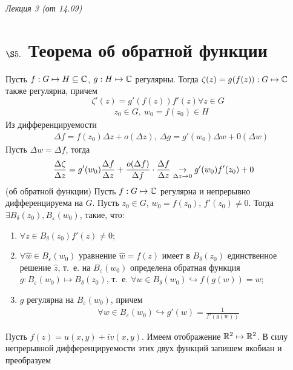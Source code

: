 \begin{flushright}
    \textit{Лекция 3 (от 14.09)}
\end{flushright}
\section{$\S 5.$ Теорема об обратной функции}
\theorem
Пусть $f: G \mapsto H \subseteq \mathbb{C}$, $g: H \mapsto \mathbb{C}$ регулярны.
Тогда $\zeta(z) = g(f(z)): G \mapsto \mathbb{C}$ также регулярна, причем
\begin{equation}\label{(3.1)}
    \zeta'(z) = g'(f(z))f'(z) \forall z \in G
\end{equation}
\pr
\begin{align*}
  & z_0 \in G, \ w_0 = f(z_0) \in H
\end{align*}
Из дифференцируемости
\begin{align*}
  & \Delta f = f(z_0)\Delta z + o(\Delta z), \ \Delta g = g'(w_0) \Delta w + 0(\Delta w)
\end{align*}
Пусть $\Delta w = \Delta f$, тогда
\begin{align*}
  & \frac{\Delta \zeta}{\Delta z} = g'(w_0) \frac{\Delta f}{\Delta z} + \frac{o(\Delta f)}{\Delta f} \cdot \frac{\Delta f}{\Delta z} \underset{\Delta z \to 0}{\to} g'(w_0)f'(z_0) + 0
\end{align*}
\theorem (об обратной функции)
Пусть $f: G \mapsto \mathbb{C}$ регулярна и непрерывно дифференцируема на $G$. Пусть
$z_0 \in G$, $w_0 = f(z_0)$, $f'(z_0) \neq 0$. Тогда $\exists B_\delta(z_0),
B_\varepsilon(w_0)$, такие, что:
\begin{enumerate}
    \item $\forall z \in B_\delta(z_0) f'(z) \neq 0$;
    \item $\forall \hat{w} \in B_\varepsilon(w_0)$ уравнение $\hat{w} = f(z)$
    имеет в $B_\delta(z_0)$ единственное решение $\hat{z}$, т.~е. на
    $B_\varepsilon(w_0)$ определена обратная функция $g: B_\varepsilon(w_0)
    \mapsto B_\delta(z_0)$, т.~е. $\forall w \in B_\delta(w_0) \hookrightarrow
    f(g(w)) = w$;
    \item $g$ регулярна на $B_\varepsilon(w_0)$, причем
    \begin{align*}
      & \forall w \in B_\varepsilon(w_0) \hookrightarrow g'(w) = \frac{1}{f'(g(w))}
    \end{align*}
\end{enumerate}
\pr
Пусть $f(z) = u(x,y) +iv(x,y)$. Имеем отображение $\mathbb{R}^2 \mapsto \mathbb{R}^2$. В силу
непрерывной дифференцируемости этих двух функций запишем якобиан и преобразуем
